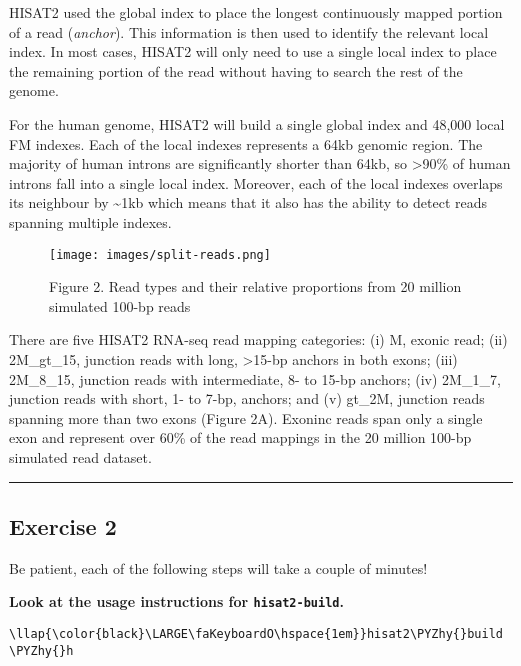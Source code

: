 \documentclass[11pt]{article}
\def\PYZhy{\char`\-}
\begin{document}
HISAT2 used the global index to place the longest continuously mapped
portion of a read (\textit{anchor}). This information is then used to
identify the relevant local index. In most cases, HISAT2 will only need
to use a single local index to place the remaining portion of the read
without having to search the rest of the genome.

For the human genome, HISAT2 will build a single global index and 48,000
local FM indexes. Each of the local indexes represents a 64kb genomic
region. The majority of human introns are significantly shorter than
64kb, so \textgreater90\% of human introns fall into a single local
index. Moreover, each of the local indexes overlaps its neighbour by
\textasciitilde1kb which means that it also has the ability to detect
reads spanning multiple indexes.

    \begin{figure}[!h]
\centering
\texttt{[image: images/split-reads.png]}
\caption{Figure 2. Read types and their relative proportions from 20
million simulated 100-bp reads}
\end{figure}

    There are five HISAT2 RNA-seq read mapping categories: (i) M, exonic
read; (ii) 2M\_gt\_15, junction reads with long, \textgreater15-bp
anchors in both exons; (iii) 2M\_8\_15, junction reads with
intermediate, 8- to 15-bp anchors; (iv) 2M\_1\_7, junction reads with
short, 1- to 7-bp, anchors; and (v) gt\_2M, junction reads spanning more
than two exons (Figure 2A). Exoninc reads span only a single exon and
represent over 60\% of the read mappings in the 20 million 100-bp
simulated read dataset.

    \begin{center}\rule{0.5\linewidth}{.4pt}\end{center}

    \hypertarget{exercise-2}{%
\subsection{Exercise 2}\label{exercise-2}}

    Be patient, each of the following steps will take a couple of minutes!

    \textbf{Look at the usage instructions for \texttt{hisat2-build}.}





\begin{terminalinput}
\begin{Verbatim}[commandchars=\\\{\}]
\llap{\color{black}\LARGE\faKeyboardO\hspace{1em}}hisat2\PYZhy{}build \PYZhy{}h
\end{Verbatim}
\end{terminalinput}
\end{document}
